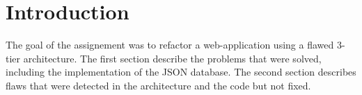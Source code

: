 \section{Introduction}

The goal of the assignement was to refactor a web-application using a flawed
3-tier architecture. The first section describe the problems that were solved,
including the implementation of the JSON database. The second section describes
flaws that were detected in the architecture and the code but not fixed.
\newpage
